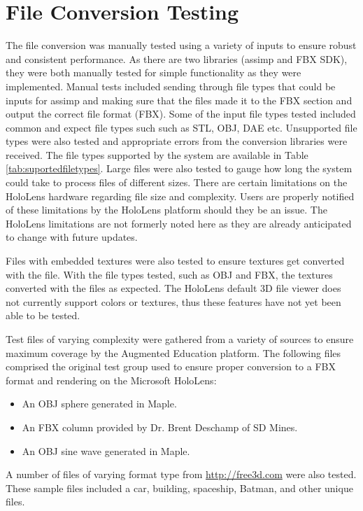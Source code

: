 
\section{File Conversion Testing}
\tab
    The file conversion was manually tested using a variety of inputs to ensure robust and consistent performance. As there are two libraries (assimp and FBX SDK), they were both manually tested for simple functionality as they were implemented. Manual tests included sending through file types that could be inputs for assimp and making sure that the files made it to the FBX section and output the correct file format (FBX). Some of the input file types tested included common and expect file types such such as STL, OBJ, DAE etc. Unsupported file types were also tested and appropriate errors from the conversion libraries were received. The file types supported by the system are available in Table \ref{tab:suportedfiletypes}. Large files were also tested to gauge how long the system could take to process files of different sizes. There are certain limitations on the HoloLens hardware regarding file size and complexity. Users are properly notified of these limitations by the HoloLens platform should they be an issue. The HoloLens limitations are not formerly noted here as they are already anticipated to change with future updates.  

    Files with embedded textures were also tested to ensure textures get converted with the file. With the file types tested, such as OBJ and FBX, the textures converted with the files as expected. The HoloLens default 3D file viewer does not currently support colors or textures, thus these features have not yet been able to be tested.

    Test files of varying complexity were gathered from a variety of sources to ensure maximum coverage by the Augmented Education platform. The following files comprised the original test group used to ensure proper conversion to a FBX format and rendering on the Microsoft HoloLens:
    \begin{itemize}
        \item An OBJ sphere generated in Maple.
        \item An FBX column provided by Dr. Brent Deschamp of SD Mines.
        \item An OBJ sine wave generated in Maple.
    \end{itemize} 
    
    A number of files of varying format type from \url{http://free3d.com} were also tested. These sample files included a car, building, spaceship, Batman, and other unique files. 
    
